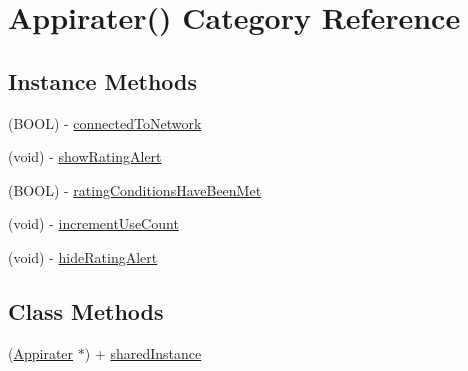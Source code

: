 \hypertarget{category_appirater_07_08}{\section{Appirater() Category Reference}
\label{category_appirater_07_08}
}
\subsection*{Instance Methods}
\begin{DoxyCompactItemize}
\item 
(B\-O\-O\-L) -\/ \hyperlink{category_appirater_07_08_a02ffeb6452a1d35adb30fd67fcaf85f1}{connected\-To\-Network}
\item 
(void) -\/ \hyperlink{category_appirater_07_08_a194e5b360af351866cf5c4ab29ab535e}{show\-Rating\-Alert}
\item 
(B\-O\-O\-L) -\/ \hyperlink{category_appirater_07_08_aef63923352fd8f5331a0c2e4a25477aa}{rating\-Conditions\-Have\-Been\-Met}
\item 
(void) -\/ \hyperlink{category_appirater_07_08_ab0366a0f1bdd2ba739b2a1ff116a6b24}{increment\-Use\-Count}
\item 
(void) -\/ \hyperlink{category_appirater_07_08_a4952ec54d4c8d9c83a9a828bd5431196}{hide\-Rating\-Alert}
\end{DoxyCompactItemize}
\subsection*{Class Methods}
\begin{DoxyCompactItemize}
\item 
(\hyperlink{interface_appirater}{Appirater} $\ast$) + \hyperlink{category_appirater_07_08_a774fcbe0609005d606ac8addbebb05b5}{shared\-Instance}
\end{DoxyCompactItemize}


